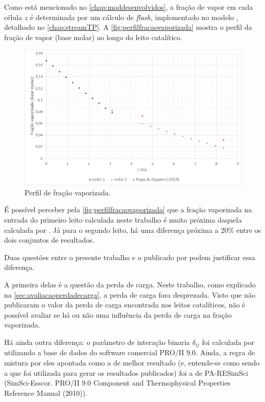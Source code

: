 Como está mencionado no \autoref{chap:moddesenvolvidos}, a fração de vapor
em cada célula $z$ é determinada por um cálculo de \emph{flash}, implementado no
modelo , detalhado no \autoref{chap:streamTP}. A
\autoref{fig:perfilfracaovaporizada} mostra o perfil da fração de vapor (base
molar) ao longo do leito catalítico.

\begin{figure}[htb]
\centering \includegraphics[scale=0.4]{images/Chap4/perfilfracaovaporizada.png}
\caption{Perfil de fração vaporizada.}
\label{fig:perfilfracaovaporizada}
\end{figure}

É possível perceber pela \autoref{fig:perfilfracaovaporizada} que a fração
vaporizada na entrada do primeiro leito calculada neste trabalho é muito próxima
daquela calculada por . Já para o segundo leito, há uma
diferença próxima a 20\% entre os dois conjuntos de resultados.

Duas questões entre o presente trabalho e o publicado por
 podem justificar essa diferença.

A primeira delas é a questão da perda de carga. Neste trabalho, como explicado
na \autoref{sec:avaliacaoperdadecarga}, a perda de carga fora desprezada. Visto
que  não publicaram o valor da perda de carga encontrada nos
leitos catalíticos, não é possível avaliar se há ou não uma influência da perda
de carga na fração vaporizada.

Há ainda outra diferença: o parâmetro de interação binaria $\delta_{ij}$ foi
calculada por  utilizando a base de dados do software
comercial PRO/II 9.0. Ainda, a regra de mistura por eles apontada como a de melhor resultado (e,
entende-se como sendo a que foi utilizada para gerar os resultados publicados)
foi a de PA-RESimSci (SimSci-Esscor. PRO/II 9.0 Component and Thermophysical
Properties Reference Manual (2010)).

